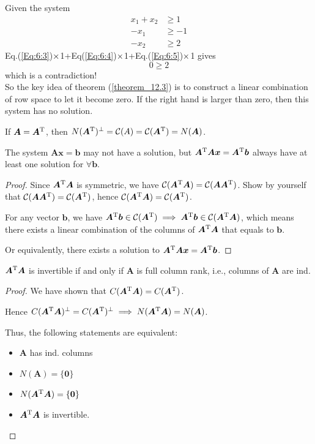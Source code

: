 \begin{example}
Given the system 
\begin{align}
x_1+x_2&\ge1\label{Eq:6:3}
\\
-x_1&\ge-1\label{Eq:6:4}
\\
-x_2&\ge2\label{Eq:6:5}
\end{align}
Eq.(\ref{Eq:6:3})$\times$1+Eq(\ref{Eq:6:4})$\times$1+Eq.(\ref{Eq:6:5})$\times$1 gives
\[
0\ge 2
\]
which is a contradiction!\\
So the key idea of theorem (\ref{theorem_12.3}) is to construct a linear combination of row space to let it become zero. If the right hand is larger than zero, then this system has no solution.
\end{example}
\begin{remark}
\begin{corollary}
If $\bm A=\bm A^{\mathrm T}$, then $N(\bm A^{\mathrm T})^{\perp}=\mathcal{C}(A)=\mathcal{C}(\bm A^{\mathrm T})=N(\bm A)$.
\end{corollary}
\begin{corollary}\label{corollary_12.5}
The system $\bm{Ax}=\bm b$ may not have a solution, but $\bm A^{\mathrm T}\bm A\bm x=\bm A^{\mathrm T}\bm b$ always have at least one solution for $\forall\bm b$.
\end{corollary}
\begin{proof}
Since $\bm A^{\mathrm T}\bm A$ is symmetric, we have $\mathcal{C}(\bm A^{\mathrm T}\bm A)=\mathcal{C}(\bm A\bm A^{\mathrm T})$. Show by yourself that $\mathcal{C}(\bm A\bm A^{\mathrm T})=\mathcal{C}(\bm A^{\mathrm T})$, hence $\mathcal{C}(\bm A^{\mathrm T}\bm A)=\mathcal{C}(\bm A^{\mathrm T})$.

For any vector $\bm b$, we have $\bm A^{\mathrm T}\bm b\in \mathcal{C}(\bm A^{\mathrm T})\implies\bm A^{\mathrm T}\bm b\in \mathcal{C}(\bm A^{\mathrm T}\bm A)$, which means there exists a linear combination of the columns of $\bm A^{\mathrm T}\bm A$ that equals to $\bm b$.

Or equivalently, there exists a solution to $\bm A^{\mathrm T}\bm A\bm x=\bm A^{\mathrm T}\bm b$.
\end{proof}
\begin{corollary}\label{corollary_12.6}
$\bm A^{\mathrm T}\bm A$ is invertible if and only if $\bm A$ is full column rank, i.e., columns of $\bm A$ are ind.
\end{corollary}
\begin{proof}
We have shown that $C(\bm A^{\mathrm T}\bm A)=C(\bm A^{\mathrm T})$.

Hence $C(\bm A^{\mathrm T}\bm A)^{\perp}=C(\bm A^{\mathrm T})^{\perp}\implies N(\bm A^{\mathrm T}\bm A)=N(\bm A)$.

Thus, the following statements are equivalent:
\begin{itemize}
\item
$\bm A$ has ind. columns
\item
$N(\bm A)=\{\bm 0\}$
\item
$N(\bm A^{\mathrm T}\bm A)=\{\bm 0\}$
\item
$\bm A^{\mathrm T}\bm A$ is invertible.
\end{itemize}
\end{proof}
\end{remark}
